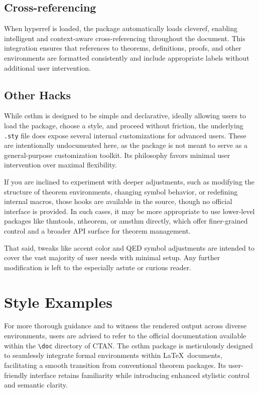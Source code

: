 \documentclass[10pt,letterpaper]{amsart}
\begin{document}
\subsection{Cross-referencing}

When \textsf{hyperref} is loaded, the package automatically loads
\textsf{cleveref}, enabling intelligent and context-aware cross-referencing
throughout the document. This integration ensures that references to theorems,
definitions, proofs, and other environments are formatted consistently and
include appropriate labels without additional user intervention.

\subsection{Other Hacks}

While \textsf{csthm} is designed to be simple and declarative, ideally allowing
users to load the package, choose a style, and proceed without friction, the
underlying \texttt{.sty} file does expose several internal customizations for
advanced users. These are intentionally undocumented here, as the package is
not meant to serve as a general-purpose customization toolkit. Its philosophy
favors minimal user intervention over maximal flexibility.

If you are inclined to experiment with deeper adjustments, such as modifying
the structure of theorem environments, changing symbol behavior, or redefining
internal macros, those hooks are available in the source, though no official
interface is provided. In such cases, it may be more appropriate to use
lower-level packages like \textsf{thmtools}, \textsf{ntheorem}, or
\textsf{amsthm} directly, which offer finer-grained control and a broader API
surface for theorem management.

That said, tweaks like accent color and QED symbol adjustments are intended to
cover the vast majority of user needs with minimal setup. Any further
modification is left to the especially astute or curious reader.

\section{Style Examples}

For more thorough guidance and to witness the rendered output across diverse
environments, users are advised to refer to the official documentation
available within the \verb|\doc| directory of CTAN. The \textsf{csthm} package
is meticulously designed to seamlessly integrate formal environments within
\LaTeX\ documents, facilitating a smooth transition from conventional theorem
packages. Its user-friendly interface retains familiarity while introducing
enhanced stylistic control and semantic clarity.
\end{document}
